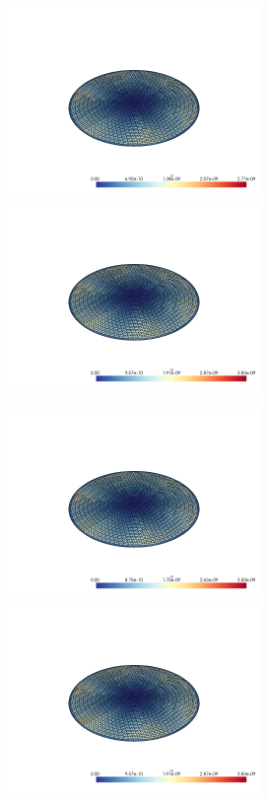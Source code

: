 \documentclass[
  11pt,
]{article}
\let\origfigure\figure
\let\endorigfigure\endfigure
\renewenvironment{figure}[1][2] {
    \expandafter\origfigure\expandafter[H]
} {
    \endorigfigure
}
\begin{document}
\begin{figure}
\caption{Finite element error in the L2 and H1 norms/seminorms, respectively for problem 1 over mesh number 4 using order 2 quadrature.}
\end{figure}

\includegraphics[width=0.5\textwidth,height=\textheight]{../img/mesh4-gauss05-b-L2.png}
\includegraphics[width=0.5\textwidth,height=\textheight]{../img/mesh4-gauss05-b-H1.png}

\begin{figure}
\caption{Finite element error in the L2 and H1 norms/seminorms, respectively for problem 1 over mesh number 4 using order 5 quadrature.}
\end{figure}

\includegraphics[width=0.5\textwidth,height=\textheight]{../img/mesh4-gauss08-b-L2.png}
\includegraphics[width=0.5\textwidth,height=\textheight]{../img/mesh4-gauss08-b-H1.png}
\end{document}
